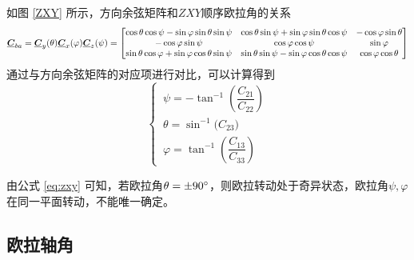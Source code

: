 
如图 \ref{ZXY} 所示，方向余弦矩阵和$ZXY$顺序欧拉角的关系
\begin{equation}
	\underline{\bm{C}}_{ba} = \underline{\bm{C}}_y(\theta)\underline{\bm{C}}_x(\varphi)\underline{\bm{C}}_z(\psi) =
	\begin{bmatrix}
		\cos \theta \cos \psi - \sin \varphi \sin \theta \sin \psi & \cos \theta \sin \psi + \sin \varphi \sin \theta \cos \psi & -\cos \varphi \sin \theta \\
		-\cos \varphi \sin \psi & \cos \varphi \cos \psi & \sin \varphi \\
		\sin \theta \cos \varphi + \sin \varphi \cos \theta \sin \psi & \sin \theta \sin \psi - \sin \varphi \cos \theta \cos \psi & \cos \varphi \cos \theta 
	\end{bmatrix}
\end{equation}
通过与方向余弦矩阵的对应项进行对比，可以计算得到
\begin{equation}
	\begin{cases}
		\, \psi = -\tan^{-1}\left( \dfrac{C_{21}}{C_{22}} \right) \\
		\, \theta = \sin^{-1}\big( C_{23} \big) \\[0.5em]
		\, \varphi = \tan^{-1} \left( \dfrac{C_{13}}{C_{33}} \right)
	\end{cases}
	\label{eq:zxy}
\end{equation}

由公式 \eqref{eq:zxy} 可知，若欧拉角$\theta = \pm 90 {}^{\circ}$，则欧拉转动处于奇异状态，欧拉角$\psi, \varphi$在同一平面转动，不能唯一确定。
\vspace*{0.5em}



\subsection{欧拉轴角}
\label{sec: 欧拉轴角}
\vspace*{-1.5em}



